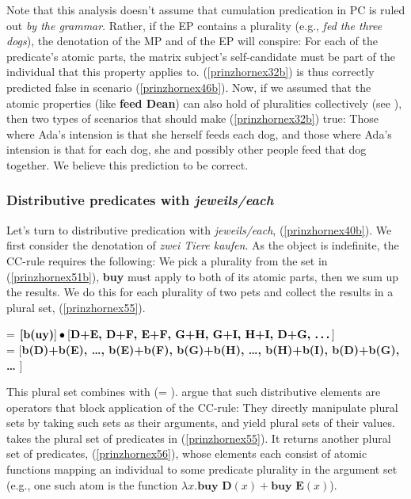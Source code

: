 \documentclass[output=paper,colorlinks,citecolor=brown,
]{langscibook}
\begin{document}
Note that this analysis doesn't assume that cumulation predication in PC is ruled out \textit{by the grammar}. Rather, if the EP contains a plurality (e.g., \textit{fed the three dogs}), the denotation of the MP and of the EP will conspire: For each of the predicate's atomic parts,  the matrix subject's self-candidate must be part of the individual that this property applies to. (\ref{prinzhornex32b}) is thus correctly predicted false in scenario (\ref{prinzhornex46b}). Now, if we assumed that the atomic properties (like \textbf{feed Dean}) can also hold of pluralities collectively (see ), then  two types of scenarios that should make (\ref{prinzhornex32b}) true: Those where Ada's intension is that she herself feeds each dog, and those where Ada's intension is that for each dog, she and possibly other people feed that dog together. We believe this prediction to be correct.








\subsubsection{Distributive predicates with \textit{jeweils/each}}\label{prinzhornsec:dist}  Let's turn to distributive predication with \textit{jeweils/each}, (\ref{prinzhornex40b}). We first consider the denotation of \textit{zwei Tiere kaufen}. As the object is indefinite, the CC-rule requires the following: We pick a plurality from the set in (\ref{prinzhornex51b}),  \textbf{buy} must apply to both of its atomic parts, then we sum up the results. We do this for each plurality of two pets and collect the results in a plural set, (\ref{prinzhornex55}).

\ea {} = $\textbf[\textbf{b(uy)}] \bullet [ \textbf{D+E, D+F, E+F, G+H, G+I, H+I, D+G,  \dots} ]$\\ = 
$[$\textbf{b(D)+b(E), \dots, b(E)+b(F), b(G)+b(H), \dots, b(H)+b(I), b(D)+b(G), \dots} $]$\label{prinzhornex55} \z

This plural set combines with  (= ). \cite{Haslinger:2018b} argue that such distributive elements are operators that block application of the CC-rule: They directly manipulate plural sets by  taking such sets as their arguments, and  yield plural sets of their values.  takes the plural set of predicates in (\ref{prinzhornex55}). It returns another plural set of predicates, (\ref{prinzhornex56}), whose elements each consist of atomic functions  mapping an individual to some predicate plurality in the argument set (e.g., one such atom is the function $\lambda x.\textbf{buy D}(x)+\textbf{buy E}(x)$).
\end{document}
